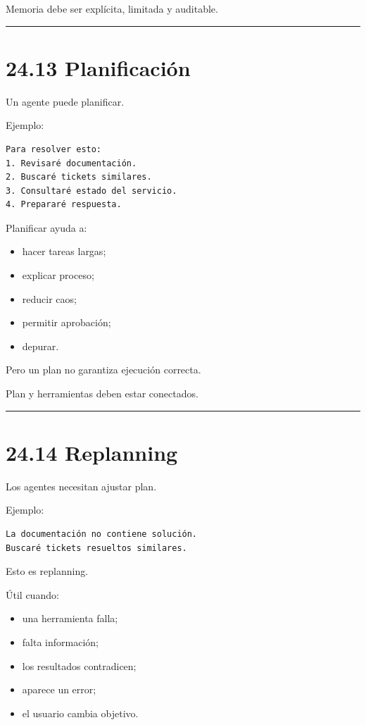 Memoria debe ser explícita, limitada y auditable.

\begin{center}\rule{0.5\linewidth}{0.5pt}\end{center}

\section{24.13 Planificación}\label{planificaciuxf3n}

Un agente puede planificar.

Ejemplo:

\begin{lstlisting}
Para resolver esto:
1. Revisaré documentación.
2. Buscaré tickets similares.
3. Consultaré estado del servicio.
4. Prepararé respuesta.
\end{lstlisting}

Planificar ayuda a:

\begin{itemize}
\tightlist
\item
  hacer tareas largas;
\item
  explicar proceso;
\item
  reducir caos;
\item
  permitir aprobación;
\item
  depurar.
\end{itemize}

Pero un plan no garantiza ejecución correcta.

Plan y herramientas deben estar conectados.

\begin{center}\rule{0.5\linewidth}{0.5pt}\end{center}

\section{24.14 Replanning}\label{replanning}

Los agentes necesitan ajustar plan.

Ejemplo:

\begin{lstlisting}
La documentación no contiene solución.
Buscaré tickets resueltos similares.
\end{lstlisting}

Esto es replanning.

Útil cuando:

\begin{itemize}
\tightlist
\item
  una herramienta falla;
\item
  falta información;
\item
  los resultados contradicen;
\item
  aparece un error;
\item
  el usuario cambia objetivo.
\end{itemize}

